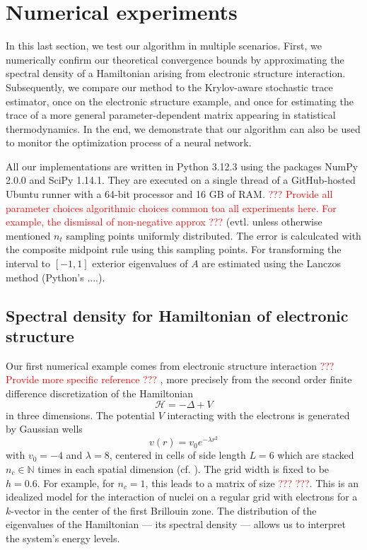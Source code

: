 
\section{Numerical experiments}
\label{sec:results}

\color{black}

In this last section, we test our algorithm in multiple scenarios. First, we numerically confirm our theoretical convergence bounds by approximating the spectral density of a Hamiltonian arising from electronic structure interaction. Subsequently, we compare our method to the Krylov-aware stochastic trace estimator, once on the electronic structure example, and once for estimating the trace of a more general parameter-dependent matrix appearing in statistical thermodynamics. In the end, we demonstrate that our algorithm can also be used to monitor the optimization process of a neural network.

All our implementations are written in Python 3.12.3 using the packages NumPy 2.0.0 and SciPy 1.14.1. They are executed on a single thread of a GitHub-hosted Ubuntu runner with a 64-bit processor and 16 GB of RAM. \textcolor{red}{??? Provide all parameter choices algorithmic choices common toa all experiments here. For example, the dismissal of non-negative approx ???}
(evtl. unless otherwise mentioned 
$n_t$ sampling points uniformly distributed.
The error is calculcated with the composite midpoint rule using this sampling points.
For transforming the interval to $[-1,1]$ exterior eigenvalues of $A$ are estimated using the Lanczos method (Python's ....).


\subsection{Spectral density for Hamiltonian of electronic structure}
\label{subsec:hamiltonian}

Our first numerical example comes from electronic structure interaction \textcolor{red}{??? Provide more specific reference ???} \cite{lin-2017-randomized-estimation}, more precisely from the second order finite difference discretization of the Hamiltonian
\begin{equation}
    \mathcal{H} = - \Delta + V
    \label{equ:5-experiments-electronic-hamiltonian}
\end{equation}
in three dimensions. The potential $V$ interacting with the electrons is generated by Gaussian wells
\begin{equation}
    v(r) = v_0 e^{-\lambda r^2}
    \label{equ:5-experiments-gaussian-cell}
\end{equation}
with $v_0 = -4$ and $\lambda = 8$, centered in cells of side length $L=6$ which are stacked $n_c \in \mathbb{N}$ times in each spatial dimension (cf. ). The grid width is fixed to be $h=0.6$. For example, for $n_c = 1$, this leads to a matrix of size \textcolor{red}{??? ???}. This is an idealized model for the interaction of nuclei on a regular grid with electrons for a $k$-vector in the center of the first Brillouin zone. The distribution of the eigenvalues of the Hamiltonian --- its spectral density --- allows us to interpret the system's energy levels.

